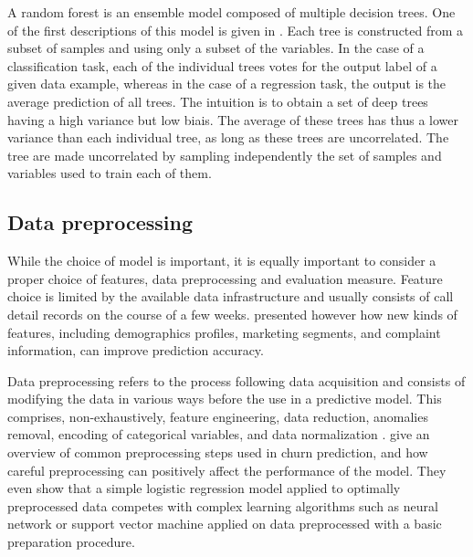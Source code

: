 A random forest is an ensemble model composed of multiple decision trees. One of
the first descriptions of this model is given in \textcite{breiman2001random}.
Each tree is constructed from a subset of samples and using only a subset of the
variables. In the case of a classification task, each of the individual trees
votes for the output label of a given data example, whereas in the case of a
regression task, the output is the average prediction of all trees. The
intuition is to obtain a set of deep trees having a high variance but low biais.
The average of these trees has thus a lower variance than each individual tree,
as long as these trees are uncorrelated. The tree are made uncorrelated by
sampling independently the set of samples and variables used to train each of
them.

\subsection{Data preprocessing}

While the choice of model is important, it is equally important to consider a
proper choice of features, data preprocessing and evaluation measure. Feature
choice is limited by the available data infrastructure and usually consists of
call detail records on the course of a few weeks. \textcite{huang2012customer}
presented however how new kinds of features, including demographics profiles,
marketing segments, and complaint information, can improve prediction accuracy.

Data preprocessing refers to the process following data acquisition and
consists of modifying the data in various ways before the use in a predictive
model. This comprises, non-exhaustively, feature engineering, data reduction,
anomalies removal, encoding of categorical variables, and data normalization
\parencite{zhang2003data}. \textcite{coussement2017comparative} give an overview
of common preprocessing steps used in churn prediction, and how careful
preprocessing can positively affect the performance of the model. They even show
that a simple logistic regression model applied to optimally preprocessed data
competes with complex learning algorithms such as neural network or support
vector machine applied on data preprocessed with a basic preparation procedure.

